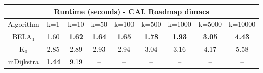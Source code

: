 \begin{tabular}{c|cccccccc}\toprule
\multicolumn{9}{c}{Runtime (seconds) - CAL Roadmap dimacs}\\ \midrule
Algorithm & k=1 & k=10 & k=50 & k=100 & k=500 & k=1000 & k=5000 & k=10000 \\ \midrule
BELA$_0$ & 1.60 & \textbf{1.62} & \textbf{1.64} & \textbf{1.65} & \textbf{1.78} & \textbf{1.93} & \textbf{3.05} & \textbf{4.43} \\
K$_0$ & 2.85 & 2.89 & 2.93 & 2.94 & 3.04 & 3.16 & 4.17 & 5.58 \\
mDijkstra & \textbf{1.44} & 9.19 & -- & -- & -- & -- & -- & -- \\ \bottomrule 
\end{tabular}
